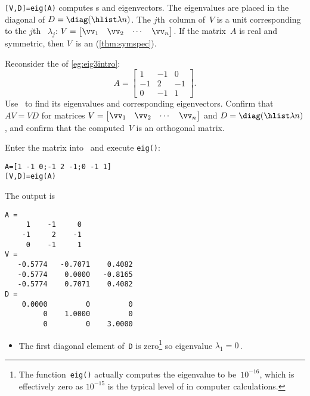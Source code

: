 \begin{compute}
\verb|[V,D]=eig(A)| computes s and eigenvectors.
The eigenvalues are placed in the diagonal of \(D=\diag(\hlist\lambda n)\). 
The \(j\)th~column of~\(V\) is a unit  corresponding to the \(j\)th ~\(\lambda_j\):
\(V=\begin{bmatrix} \vv_1&\vv_2&\cdots&\vv_n \end{bmatrix}\).
If the matrix~\(A\) is real and symmetric, then \(V\)~is an  (\cref{thm:symspec}).
\end{compute}

\begin{example} \label{eg:eig3eig}
Reconsider the  of \cref{eg:eig3intro}:
\begin{equation*}
A=\begin{bmatrix} 1&-1&0\\-1&2&-1\\0&-1&1 \end{bmatrix}.
\end{equation*}
Use \script\ to find its eigenvalues and corresponding eigenvectors.
Confirm that \(AV=VD\) for matrices \(V=\begin{bmatrix} \vv_1&\vv_2&\cdots&\vv_n \end{bmatrix}\) and \(D=\diag(\hlist\lambda n)\), and confirm that the computed~\(V\) is an orthogonal matrix.
\begin{solution} 
Enter the matrix into \script\ and execute \verb|eig()|:
\setbox\ajrqrbox\hbox{}%
\marginajrbox%
\begin{verbatim}
A=[1 -1 0;-1 2 -1;0 -1 1]
[V,D]=eig(A)
\end{verbatim}
The output is
\begin{verbatim}
A =
     1    -1     0
    -1     2    -1
     0    -1     1
V =
   -0.5774   -0.7071    0.4082
   -0.5774    0.0000   -0.8165
   -0.5774    0.7071    0.4082
D =
    0.0000         0         0
         0    1.0000         0
         0         0    3.0000
\end{verbatim}
\begin{itemize}
\item The first diagonal element of~\verb|D| is zero\footnote{The function~\texttt{eig()} actually computes the eigenvalue to be~\(10^{-16}\), which is effectively zero as \(10^{-15}\) is the typical level of  in computer calculations.} so eigenvalue \(\lambda_1=0\)\,.

\end{itemize}
\end{solution}
\end{example}
